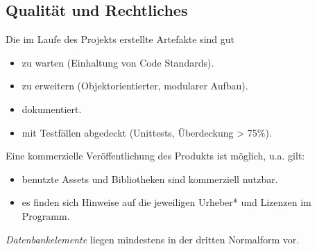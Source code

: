 \subsection{Qualität und Rechtliches}
\begin{requirements}
     Die im Laufe des Projekts erstellte Artefakte sind gut
    \begin{itemize}
        \item zu warten (Einhaltung von Code Standards).
        \item zu erweitern (Objektorientierter, modularer Aufbau).
        \item dokumentiert.
        \item mit Testfällen abgedeckt (Unittests, Überdeckung > 75\%).
    \end{itemize}
     Eine kommerzielle Veröffentlichung des Produkts ist möglich, u.a. gilt:
    \begin{itemize}
        \item benutzte Assets und Bibliotheken sind kommerziell nutzbar.
        \item es finden sich Hinweise auf die jeweiligen Urheber* und Lizenzen im Programm.
    \end{itemize}
     \emph{Datenbankelemente} liegen mindestens in der dritten Normalform vor.
\end{requirements}
